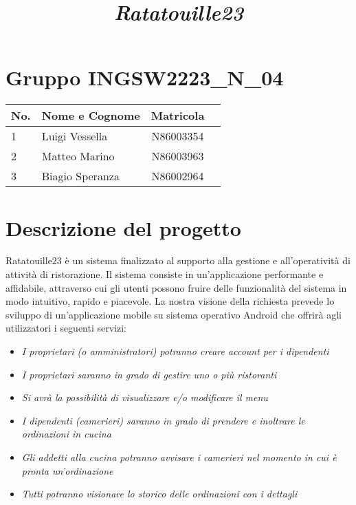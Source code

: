 \documentclass{article}
\title{\textit{Ratatouille23}}
\numberwithin{equation}{section}
\numberwithin{figure}{section}
\begin{document}
\coverpage%

\section*{Gruppo INGSW2223\_N\_04}
\begin{center}
\Large{
  \begin{tabular}{llcc}
    \toprule
        \textbf{No.} & \textbf{Nome e Cognome} & \textbf{Matricola} \\
    \midrule
        1           & Luigi Vessella                & N86003354\\
        2           & Matteo Marino                 & N86003963\\
        3           & Biagio Speranza               & N86002964\\
    \bottomrule
  \end{tabular}
 }
\end{center}

\newpage
\tableofcontents
\newpage
\section{Descrizione del progetto}
    {\large 
        Ratatouille23 è un sistema finalizzato al supporto alla gestione e all’operatività di attività di
        ristorazione. Il sistema consiste in un’applicazione performante e affidabile, attraverso cui gli utenti
        possono fruire delle funzionalità del sistema in modo intuitivo, rapido e piacevole. 
        La nostra visione della richiesta prevede lo sviluppo di un'applicazione mobile su sistema operativo Android che offrirà agli utilizzatori i seguenti servizi: 
    }
    
    \begin{itemize}
        \item \textit{ I proprietari (o amministratori) potranno creare account per i dipendenti}
        \item \textit{I proprietari saranno in grado di gestire uno o più ristoranti}
        \item \textit{Si avrà la possibilità di visualizzare e/o modificare il menu}
        \item \textit{I dipendenti (camerieri) saranno in grado di prendere e inoltrare le ordinazioni in cucina}
        \item \textit{Gli addetti alla cucina potranno avvisare i camerieri nel momento in cui è pronta un'ordinazione}
        \item \textit{Tutti potranno visionare lo storico delle ordinazioni con i dettagli}
        
    \end{itemize} 
    
\end{document}
